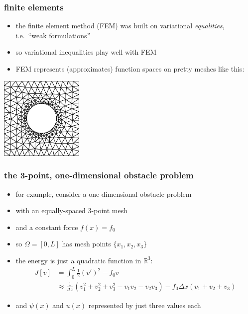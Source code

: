\documentclass{beamer}
\newcommand{\RR}{\mathbb{R}}
\begin{document}
\begin{frame}
  \frametitle{finite elements}

\begin{itemize}
\item the finite element method (FEM) was built on variational \emph{equalities}, i.e.~``weak formulations''
\item so variational inequalities play well with FEM
\item FEM represents (approximates) function spaces on pretty meshes like this:
\end{itemize}

\begin{center}
\includegraphics[width=0.3\textwidth]{figs/constantineexample3}
\end{center}
\end{frame}


\begin{frame}
  \frametitle{the 3-point, one-dimensional obstacle problem}

\begin{itemize}
\item for example, consider a one-dimensional obstacle problem
\item with an equally-spaced 3-point mesh
\item and a constant force $f(x) = f_0$
\item so $\Omega = [0,L]$ has mesh points $\{x_1,x_2,x_3\}$
\item the energy is just a quadratic function in $\RR^3$:
\begin{align*}
 J[v] &= \int_0^L \frac{1}{2} (v')^2 - f_0 v \\
      &\approx \frac{1}{\Delta x} \left(v_1^2 + v_2^2 + v_3^2 - v_1 v_2 - v_2 v_3\right) - f_0 \Delta x (v_1+v_2+v_3)
\end{align*}
\item and $\psi(x)$ and $u(x)$ represented by just three values each
\end{itemize}
\end{frame}
\end{document}
